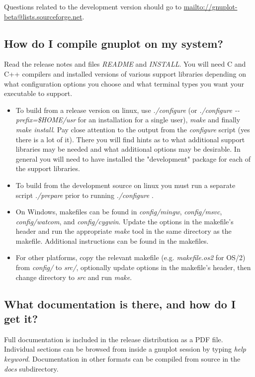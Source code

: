 \documentclass[a4paper,11pt]{article}
\def\mailto#1{{\small\href{mailto://#1}{\url{mailto://#1}}}}
\newcommand{\mailto}[1]%
            {\htmladdnormallink{\latex{\url{<#1>}}\html{\textit{#1}}}%
                {mailto:#1}%
            }
\newcommand{\gnuplot}{\textbf{gnuplot }}
\begin{document}
Questions related to the development version should go to
\mailto{gnuplot-beta@lists.sourceforge.net}.


\subsection{How do I compile \gnuplot on my system?}

Read the release notes and files \textit{README} and \textit{INSTALL}.
You will need C and C++ compilers and installed versions of various
support libraries depending on what configuration options you choose and what
terminal types you want your executable to support.

\begin{itemize}
\item
To build from a release version on linux, use \textit{./configure} (or \textit{./configure {-}{-}prefix=\$HOME/usr}
for an installation for a single user), \textit{make} and finally
\textit{make install}.  Pay close attention to the output from the \textit{configure}
script (yes there is a lot of it).
There you will find hints as to what additional support libraries may be needed and
what additional options may be desirable.  In general you will need to have installed
the "development" package for each of the support libraries.
\item
To build from the development source on linux you must run a separate script \textit{./prepare}
prior to running \textit{./configure} .
\item
On Windows, makefiles can be found in \textit{config/mingw}, \textit{config/msvc},
\textit{config/watcom}, and \textit{config/cygwin}. Update the options in the 
makefile's header and run the appropriate \textit{make} tool in the same directory
as the makefile. Additional instructions can be found in the makefiles.
\item
For other platforms, copy the relevant makefile (e.g. \textit{makefile.os2} for
OS/2) from \textit{config/} to \textit{src/}, optionally update options in the
makefile's header, then change directory to \textit{src} and run \textit{make}.
\end{itemize}


\subsection{What documentation is there, and how do I get it?}

Full documentation is included in the release distribution as a PDF file.
Individual sections can be browsed from inside a gnuplot session
by typing \textit{help {\em keyword}}.
Documentation in other formats can be compiled from source in the
{\em docs} subdirectory.
\end{document}
